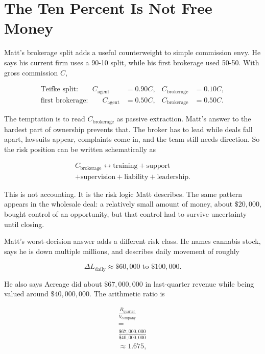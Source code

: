 \documentclass[11pt,oneside]{book}
\begin{document}
\section{The Ten Percent Is Not Free Money}

Matt's brokerage split adds a useful counterweight to simple commission envy. He says his current firm uses a 90-10 split, while his first brokerage used 50-50. With gross commission \(C\),

\begin{align}
\text{Teifke split:}\qquad
C_{\text{agent}}&=0.90C,
&
C_{\text{brokerage}}&=0.10C,\\
\text{first brokerage:}\qquad
C_{\text{agent}}&=0.50C,
&
C_{\text{brokerage}}&=0.50C.
\end{align}

The temptation is to read \(C_{\text{brokerage}}\) as passive extraction. Matt's answer to the hardest part of ownership prevents that. The broker has to lead while deals fall apart, lawsuits appear, complaints come in, and the team still needs direction. So the risk position can be written schematically as

\begin{equation}
\begin{gathered}
C_{\text{brokerage}}\longleftrightarrow\text{training}+\text{support}\\
+\text{supervision}+\text{liability}+\text{leadership}.
\end{gathered}
\end{equation}

This is not accounting. It is the risk logic Matt describes. The same pattern appears in the wholesale deal: a relatively small amount of money, about \(\$20{,}000\), bought control of an opportunity, but that control had to survive uncertainty until closing.

Matt's worst-decision answer adds a different risk class. He names cannabis stock, says he is down multiple millions, and describes daily movement of roughly

\begin{equation}
\Delta L_{\text{daily}}\approx \$60{,}000\text{ to }\$100{,}000.
\end{equation}

He also says Acreage did about \(\$67{,}000{,}000\) in last-quarter revenue while being valued around \(\$40{,}000{,}000\). The arithmetic ratio is

\begin{equation}
\begin{gathered}
\frac{R_{\text{quarter}}}{V_{\text{company}}}\\
=\\
\frac{\$67{,}000{,}000}{\$40{,}000{,}000}\\
\approx 1.675,
\end{gathered}
\end{equation}
\end{document}
